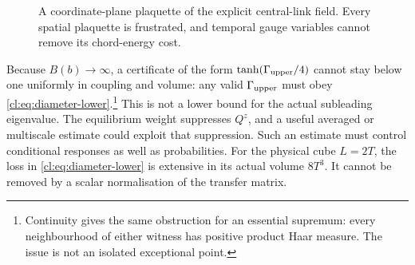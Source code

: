 \begin{figure}[htbp]
\centering
{}
\caption{A coordinate-plane plaquette of the explicit central-link
field. Every spatial plaquette is frustrated, and temporal gauge
variables cannot remove its chord-energy cost.}
\label{cl:fig:frustration}
\end{figure}

Because $B(b)\to\infty$, a certificate of the form
$\tanh(\Gamma_{\rm upper}/4)$ cannot stay below one uniformly in
coupling and volume: any valid $\Gamma_{\rm upper}$ must obey
\eqref{cl:eq:diameter-lower}.\footnote{Continuity gives the same obstruction
for an essential supremum: every neighbourhood of either witness has
positive product Haar measure. The issue is not an isolated exceptional point.}
This is not a lower bound for the actual subleading eigenvalue.
The equilibrium weight suppresses $Q^z$, and a useful averaged or
multiscale estimate could exploit that suppression. Such an estimate
must control conditional responses as well as probabilities.
For the physical cube $L=2T$, the loss in
\eqref{cl:eq:diameter-lower} is extensive in its actual volume $8T^3$.
It cannot be removed by a scalar normalisation of the transfer matrix.
